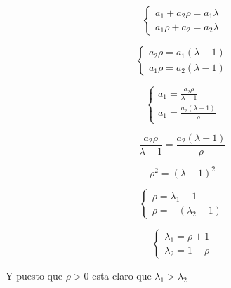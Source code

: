 \documentclass[a4paper,10pt]{article}
\begin{document}
\begin{enumerate}
  \begin{equation*}
    \begin{cases}
      a_1 + a_2\rho = a_1\lambda \\
      a_1\rho + a_2 = a_2\lambda
    \end{cases}
  \end{equation*}

  \begin{equation*}
    \begin{cases}
      a_2\rho = a_1(\lambda - 1) \\
      a_1\rho = a_2(\lambda - 1)
    \end{cases}
  \end{equation*}

  \begin{equation*}
    \begin{cases}
      a_1 = \frac{a_2\rho}{\lambda - 1} \\
      a_1 = \frac{a_2(\lambda - 1)}{\rho}
    \end{cases}
  \end{equation*}

  \begin{equation*}
      \frac{a_2\rho}{\lambda - 1} =
      \frac{a_2(\lambda - 1)}{\rho}
  \end{equation*}

  \begin{equation*}
    \rho^2 = (\lambda -1)^2
  \end{equation*}

  \begin{equation*}
    \begin{cases}
      \rho = \lambda_1 - 1 \\
      \rho = -(\lambda_2 - 1)
    \end{cases}
  \end{equation*}

  \begin{equation*}
    \begin{cases}
      \lambda_1 = \rho + 1 \\
      \lambda_2 = 1 - \rho
    \end{cases}
  \end{equation*}

  Y puesto que $\rho > 0$ esta claro que $\lambda_1 > \lambda_2$





\end{enumerate}
\end{document}
